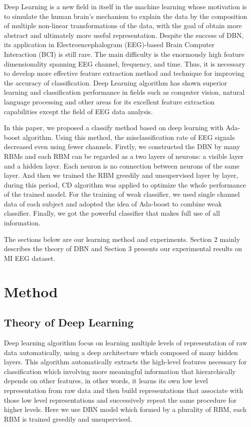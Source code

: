\documentclass{llncs}
\begin{document}
Deep Learning is a new field in itself in the machine learning whose motivation is to simulate the human brain’s mechanism to explain the data by the composition of multiple non-linear transformations of the data, with the goal of obtain more abstract and ultimately more useful representation\cite{3}\cite{5}. Despite the success of DBN, its application in Electroencephalogram (EEG)-based Brain Computer Interaction (BCI) is still rare. The main difficulty is the enormously high feature dimensionality spanning EEG channel, frequency, and time\cite{10}. Thus, it is necessary to develop more effective feature extraction method and technique for improving the accuracy of classification. Deep Learning algorithm has shown superior learning and classification performance in fields such as computer vision, natural language processing and other areas for its excellent feature extraction capabilities except the field of EEG data analysis\cite{15}. 

In this paper, we proposed a classify method based on deep learning with Ada-boost algorithm. Using this method, the misclassification rate of EEG signals decreased even using fewer channels. Firstly, we constructed the DBN by many RBMs and each RBM can be regarded as a two layers of neurons: a visible layer and a hidden layer. Each neuron is no connection between neurons of the same layer. And then we trained the RBM greedily and unsupervised layer by layer, during this period, CD algorithm was applied to optimize the whole performance of the trained model. For the training of weak classifier, we used single channel data of each subject and adopted the idea of Ada-boost to combine weak classifier. Finally, we got the powerful classifier that makes full use of all information. 


The sections below are our learning method and experiments. Section 2 mainly describes the theory of DBN and Section 3 presents our experimental results on MI EEG dataset.


\section{Method}

%
\subsection{Theory of Deep Learning}
%
Deep learning algorithm focus on learning multiple levels of representation of raw data automatically, using a deep architecture which composed of many hidden layers. This algorithm automatically extracts the high-level features necessary for classification which involving more meaningful information that hierarchically depends on other features, in other words, it learns its own low level representation from raw data and then build representations that associate with those low level representations and successively repeat the same procedure for higher levels. Here we use DBN model which formed by a plurality of RBM, each RBM is trained greedily and unsupervised\cite{5}.
\end{document}
